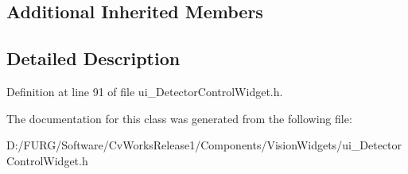 \subsection*{Additional Inherited Members}


\subsection{Detailed Description}


Definition at line 91 of file ui\+\_\+\+Detector\+Control\+Widget.\+h.



The documentation for this class was generated from the following file\+:\begin{DoxyCompactItemize}
\item 
D\+:/\+F\+U\+R\+G/\+Software/\+Cv\+Works\+Release1/\+Components/\+Vision\+Widgets/ui\+\_\+\+Detector\+Control\+Widget.\+h\end{DoxyCompactItemize}
